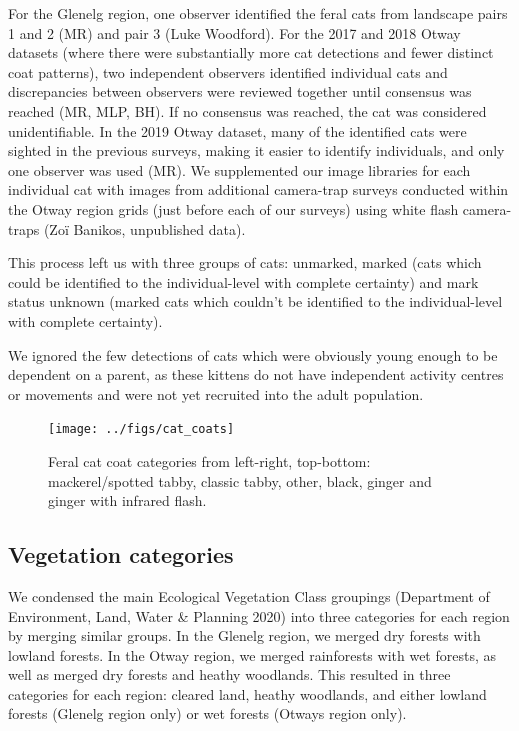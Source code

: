 \documentclass[preprint, 3p, authoryear]{elsarticle} %
\begin{document}
For the Glenelg region, one observer identified the feral cats from landscape pairs 1 and 2 (MR) and pair 3 (Luke Woodford). For the 2017 and 2018 Otway datasets (where there were substantially more cat detections and fewer distinct coat patterns), two independent observers identified individual cats and discrepancies between observers were reviewed together until consensus was reached (MR, MLP, BH). If no consensus was reached, the cat was considered unidentifiable. In the 2019 Otway dataset, many of the identified cats were sighted in the previous surveys, making it easier to identify individuals, and only one observer was used (MR). We supplemented our image libraries for each individual cat with images from additional camera-trap surveys conducted within the Otway region grids (just before each of our surveys) using white flash camera-traps (Zoï Banikos, unpublished data).

This process left us with three groups of cats: unmarked, marked (cats which could be identified to the individual-level with complete certainty) and mark status unknown (marked cats which couldn't be identified to the individual-level with complete certainty).

We ignored the few detections of cats which were obviously young enough to be dependent on a parent, as these kittens do not have independent activity centres or movements and were not yet recruited into the adult population.

\newpage

\begin{figure}

{\centering \texttt{[image: ../figs/cat\_coats]} 

}

\caption{Feral cat coat categories from left-right, top-bottom: mackerel/spotted tabby, classic tabby, other, black, ginger and ginger with infrared flash.}\label{fig:density-cat-photo}
\end{figure}

\newpage

\hypertarget{density-app-veg}{%
\subsection{Vegetation categories}\label{density-app-veg}}

We condensed the main Ecological Vegetation Class groupings (Department of Environment, Land, Water \& Planning 2020) into three categories for each region by merging similar groups. In the Glenelg region, we merged dry forests with lowland forests. In the Otway region, we merged rainforests with wet forests, as well as merged dry forests and heathy woodlands. This resulted in three categories for each region: cleared land, heathy woodlands, and either lowland forests (Glenelg region only) or wet forests (Otways region only).
\end{document}
